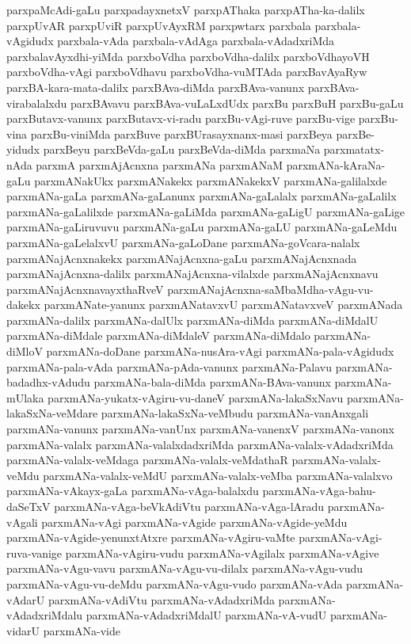 {parxpaMcAdi-gaLu
parxpadayxnetxV
parxpAThaka
parxpATha-ka-dalilx
parxpUvAR
parxpUviR
parxpUvAyxRM
parxpwtarx
parxbala
parxbala-vAgidudx
parxbala-vAda
parxbala-vAdAga
parxbala-vAdadxriMda
parxbalavAyxdhi-yiMda
parxboVdha
parxboVdha-dalilx
parxboVdhayoVH
parxboVdha-vAgi
parxboVdhavu
parxboVdha-vuMTAda
parxBavAyaRyw
parxBA-kara-mata-dalilx
parxBAva-diMda
parxBAva-vanunx
parxBAva-virabalalxdu
parxBAvavu
parxBAva-vuLaLxdUdx
parxBu
parxBuH
parxBu-gaLu
parxButavx-vanunx
parxButavx-vi-radu
parxBu-vAgi-ruve
parxBu-vige
parxBu-vina
parxBu-viniMda
parxBuve
parxBUrasayxnanx-masi
parxBeya
parxBe-yidudx
parxBeyu
parxBeVda-gaLu
parxBeVda-diMda
parxmaNa
parxmatatx-nAda
parxmA
parxmAjAcnxna
parxmANa
parxmANaM
parxmANa-kAraNa-gaLu
parxmANakUkx
parxmANakekx
parxmANakekxV
parxmANa-galilalxde
parxmANa-gaLa
parxmANa-gaLanunx
parxmANa-gaLalalx
parxmANa-gaLalilx
parxmANa-gaLalilxde
parxmANa-gaLiMda
parxmANa-gaLigU
parxmANa-gaLige
parxmANa-gaLiruvuvu
parxmANa-gaLu
parxmANa-gaLU
parxmANa-gaLeMdu
parxmANa-gaLelalxvU
parxmANa-gaLoDane
parxmANa-goVcara-nalalx
parxmANajAcnxnakekx
parxmANajAcnxna-gaLu
parxmANajAcnxnada
parxmANajAcnxna-dalilx
parxmANajAcnxna-vilalxde
parxmANajAcnxnavu
parxmANajAcnxnavayxthaRveV
parxmANajAcnxna-saMbaMdha-vAgu-vu-dakekx
parxmANate-yanunx
parxmANatavxvU
parxmANatavxveV
parxmANada
parxmANa-dalilx
parxmANa-dalUlx
parxmANa-diMda
parxmANa-diMdalU
parxmANa-diMdale
parxmANa-diMdaleV
parxmANa-diMdalo
parxmANa-diMloV
parxmANa-doDane
parxmANa-nusAra-vAgi
parxmANa-pala-vAgidudx
parxmANa-pala-vAda
parxmANa-pAda-vanunx
parxmANa-Palavu
parxmANa-badadhx-vAdudu
parxmANa-bala-diMda
parxmANa-BAva-vanunx
parxmANa-mUlaka
parxmANa-yukatx-vAgiru-vu-daneV
parxmANa-lakaSxNavu
parxmANa-lakaSxNa-veMdare
parxmANa-lakaSxNa-veMbudu
parxmANa-vanAnxgali
parxmANa-vanunx
parxmANa-vanUnx
parxmANa-vanenxV
parxmANa-vanonx
parxmANa-valalx
parxmANa-valalxdadxriMda
parxmANa-valalx-vAdadxriMda
parxmANa-valalx-veMdaga
parxmANa-valalx-veMdathaR
parxmANa-valalx-veMdu
parxmANa-valalx-veMdU
parxmANa-valalx-veMba
parxmANa-valalxvo
parxmANa-vAkayx-gaLa
parxmANa-vAga-balalxdu
parxmANa-vAga-bahu-daSeTxV
parxmANa-vAga-beVkAdiVtu
parxmANa-vAga-lAradu
parxmANa-vAgali
parxmANa-vAgi
parxmANa-vAgide
parxmANa-vAgide-yeMdu
parxmANa-vAgide-yenunxtAtxre
parxmANa-vAgiru-vaMte
parxmANa-vAgi-ruva-vanige
parxmANa-vAgiru-vudu
parxmANa-vAgilalx
parxmANa-vAgive
parxmANa-vAgu-vavu
parxmANa-vAgu-vu-dilalx
parxmANa-vAgu-vudu
parxmANa-vAgu-vu-deMdu
parxmANa-vAgu-vudo
parxmANa-vAda
parxmANa-vAdarU
parxmANa-vAdiVtu
parxmANa-vAdadxriMda
parxmANa-vAdadxriMdalu
parxmANa-vAdadxriMdalU
parxmANa-vA-vudU
parxmANa-vidarU
parxmANa-vide
}
